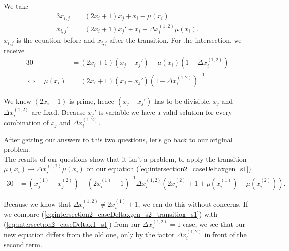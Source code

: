 \begin{enumerate}
	We take
	\begin{alignat}{3}
		x_{i,j} &= \left(2x_{i} + 1\right)x_{j} + x_{i} - \mu\left(x_{i}\right) \label{eq:question2_eq1} \\
		x_{i,j}\prime &= \left(2x_{i} + 1\right)x_{j}\prime + x_{i} - \Delta x_{i}^{\left(1,2\right)}\mu\left(x_{i}\right) \label{eq:question2_eq2}.
	\end{alignat}
	$x_{i,j}$ is the equation before and $x_{i,j}$ after the transition. For the intersection, we receive
	\begin{alignat}{3}
		0 &= \left(2x_{i} + 1\right)\left(x_{j} - x_{j}\prime\right) - \mu\left(x_{i}\right)\left(1 - \Delta x_{i}^{\left(1,2\right)}\right) \label{eq:question2_intersec} \\
		\Leftrightarrow \quad \mu\left(x_{i}\right) &= \left(2x_{i} + 1\right)\left(x_{j} - x_{j}\prime\right)\left(1 - \Delta x_{i}^{\left(1,2\right)}\right)^{-1}. \label{eq:question2_intersec}
	\end{alignat}

	We know $\left(2x_{i} + 1\right)$ is prime, hence $\left(x_{j} - x_{j}\prime\right)$ has to be divisible. $x_{j}$ and $\Delta x_{i}^{\left(1,2\right)}$ are fixed. Because $x_{j}\prime$ is variable we have a valid solution for every combination of $x_{j}$ and $\Delta x_{i}^{\left(1,2\right)}$.

\label{en:transitionquestions}
\end{enumerate}

After getting our answers to this two questions, let's go back to our original problem.\\

The results of our questions show that it isn't a problem, to apply the transition $\mu\left(x_{i}\right) \rightarrow \Delta x_{i}^{\left(1,2\right)}\mu\left(x_{i}\right)$ on our equation (\ref{eq:intersection2_caseDeltaxgen_s1})
\begin{alignat}{3}
	0 & = \left(x_{j}^{\left(1\right)} - x_{j}^{\left(2\right)}\right) - \left(2x_{i}^{\left(1\right)} + 1\right)^{-1} \Delta x_{i}^{\left(1,2\right)}\left(2x_{j}^{\left(2\right)} + 1 + \mu\left(x_{i}^{\left(1\right)} \right) - \mu\left(x_{i}^{\left(2\right)}\right)\right). \label{eq:intersection2_caseDeltaxgen_s2_transition_s1}
\end{alignat}

Because we know that $\Delta x_{i}^{\left(1,2\right)} \neq 2x_{i}^{\left(1\right)} + 1$, we can do this without concerns. If we compare (\ref{eq:intersection2_caseDeltaxgen_s2_transition_s1}) with (\ref{eq:intersection2_caseDeltax1_s1}) from our $\Delta x_{i}^{\left(1,2\right)} = 1$ case, we see that our new equation differs from the old one, only by the factor $\Delta x_{i}^{\left(1,2\right)}$ in front of the second term.\\

